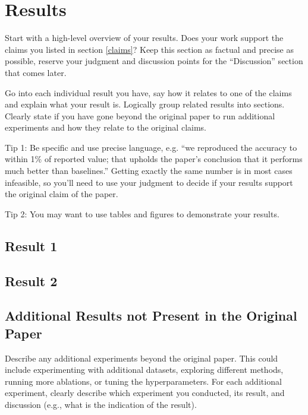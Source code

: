\documentclass{article}
\begin{document}
\section{Results}
Start with a high-level overview of your results. Does your work support the claims you listed in section \ref{claims}? Keep this section as factual and precise as possible, reserve your judgment and discussion points for the ``Discussion'' section that comes later. 

Go into each individual result you have, say how it relates to one of the claims and explain what your result is. Logically group related results into sections. Clearly state if you have gone beyond the original paper to run additional experiments and how they relate to the original claims. 

Tip 1: Be specific and use precise language, e.g. ``we reproduced the accuracy to within 1\% of reported value; that upholds the paper's conclusion that it performs much better than baselines.'' Getting exactly the same number is in most cases infeasible, so you'll need to use your judgment to decide if your results support the original claim of the paper. 

Tip 2: You may want to use tables and figures to demonstrate your results.


\subsection{Result 1}

\subsection{Result 2}

\subsection{Additional Results not Present in the Original Paper}

Describe any additional experiments beyond the original paper. This could include experimenting with additional datasets, exploring different methods, running more ablations, or tuning the hyperparameters. For each additional experiment, clearly describe which experiment you conducted, its result, and discussion (e.g., what is the indication of the result).
\end{document}

